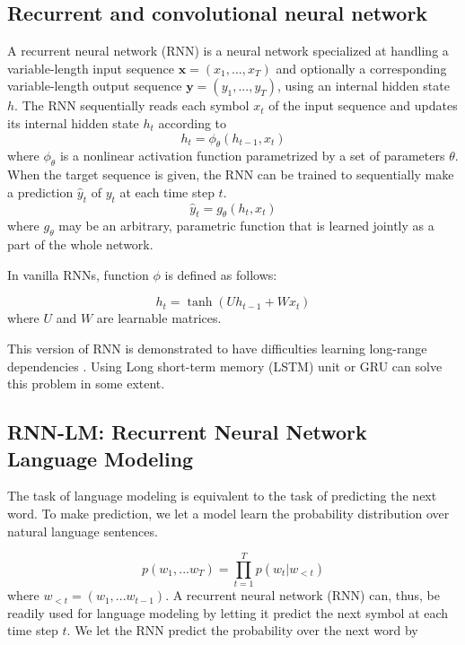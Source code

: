 \subsection{Recurrent and convolutional neural network}
A recurrent neural network (RNN) is a neural network specialized at handling a variable-length input sequence $\mathbf{x}=(x_1,...,x_T)$ and optionally a corresponding variable-length output sequence $\mathbf{y}=(y_1,...,y_T)$, using an internal hidden state $h$. The RNN sequentially reads each symbol $x_t$ of the input sequence and updates its internal hidden state $h_t$ according to
\begin{equation}
h_t=\phi_\theta(h_{t-1},x_t)
\end{equation}
where $\phi_\theta$ is a nonlinear activation function parametrized by a set of parameters $\theta$. When the target sequence is given, the RNN can be trained to sequentially make a prediction $\hat{y}_t$ of $y_t$ at each time step $t$.
\begin{equation}
\hat{y}_t=g_\theta(h_{t},x_t)
\end{equation}
where $g_\theta$ may be an arbitrary, parametric function that is learned jointly as a part of the whole network.

In vanilla RNNs, function $\phi$ is defined as follows:

\begin{equation}
h_t=\tanh(Uh_{t-1}+Wx_t)
\end{equation}
where $U$ and $W$ are learnable matrices.

This version of RNN is demonstrated to have difficulties learning long-range dependencies \cite{hochreiter1991untersuchungen,pascanu2013difficulty}. Using Long short-term memory (LSTM) unit \cite{hochreiter1997long} or GRU \cite{chung2014empirical,cho2014learning} can solve this problem in some extent.

\subsection{RNN-LM: Recurrent Neural Network Language Modeling}
The task of language modeling is equivalent to the task of predicting the next word. To make prediction, we let a model learn the probability distribution over natural language sentences.

\begin{equation}
p(w_1,...w_T)=\prod_{t=1}^{T}p(w_t|w_{<t})
\end{equation}
where $w_{<t}=(w_1,...w_{t-1})$. A recurrent neural network (RNN) can, thus, be readily used for language modeling by letting it predict the next symbol at each time step $t$. We let the RNN
predict the probability over the next word by

